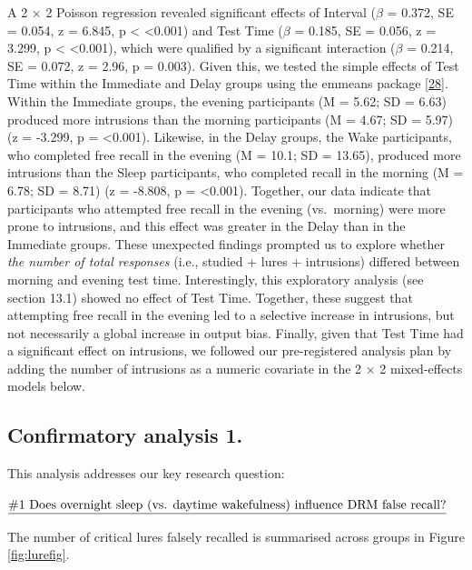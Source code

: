 \documentclass[
]{article}
\begin{document}
A 2 \(\times\) 2 Poisson regression revealed significant effects of Interval (\(\beta\) = 0.372, SE = 0.054, z = 6.845, p \textless{} \textless0.001) and Test Time (\(\beta\) = 0.185, SE = 0.056, z = 3.299, p \textless{} \textless0.001), which were qualified by a significant interaction (\(\beta\) = 0.214, SE = 0.072, z = 2.96, p = 0.003). Given this, we tested the simple effects of Test Time within the Immediate and Delay groups using the emmeans package {[}\protect\hyperlink{ref-lenth2021a}{28}{]}. Within the Immediate groups, the evening participants (M = 5.62; SD = 6.63) produced more intrusions than the morning participants (M = 4.67; SD = 5.97) (z = -3.299, p = \textless0.001). Likewise, in the Delay groups, the Wake participants, who completed free recall in the evening (M = 10.1; SD = 13.65), produced more intrusions than the Sleep participants, who completed recall in the morning (M = 6.78; SD = 8.71) (z = -8.808, p = \textless0.001). Together, our data indicate that participants who attempted free recall in the evening (vs.~morning) were more prone to intrusions, and this effect was greater in the Delay than in the Immediate groups. These unexpected findings prompted us to explore whether \emph{the number of total responses} (i.e., studied + lures + intrusions) differed between morning and evening test time. Interestingly, this exploratory analysis (see section 13.1) showed no effect of Test Time. Together, these suggest that attempting free recall in the evening led to a selective increase in intrusions, but not necessarily a global increase in output bias. Finally, given that Test Time had a significant effect on intrusions, we followed our pre-registered analysis plan by adding the number of intrusions as a numeric covariate in the 2 \(\times\) 2 mixed-effects models below.

\hypertarget{confirmatory-analysis-1.}{%
\subsection{Confirmatory analysis 1.}\label{confirmatory-analysis-1.}}

This analysis addresses our key research question:

\(\text{\underline{\#1 Does overnight sleep (vs. daytime wakefulness) influence DRM false recall?}}\)

The number of critical lures falsely recalled is summarised across groups in Figure \ref{fig:lurefig}.
\end{document}
